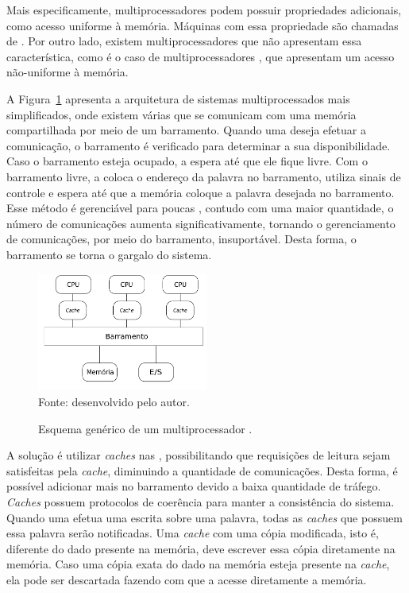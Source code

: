 Mais especificamente, multiprocessadores podem possuir propriedades adicionais,
como acesso uniforme à memória. Máquinas com essa propriedade são chamadas de
\uma. Por outro lado, existem multiprocessadores que não apresentam essa
característica, como é o caso de multiprocessadores \numa, que apresentam um acesso
não-uniforme à memória.


A Figura~\ref{fig:uma} apresenta a arquitetura de sistemas multiprocessados \uma
mais simplificados, onde existem várias \cpus que se
comunicam com uma memória compartilhada por meio de um barramento. Quando uma
\cpu deseja efetuar a comunicação, o barramento é verificado para
determinar a sua disponibilidade. Caso o barramento esteja ocupado, a
\cpu espera até que ele fique livre. Com o barramento livre, a \cpu
coloca o endereço da palavra no barramento, utiliza sinais de
controle e espera até que a memória coloque a palavra desejada no barramento. Esse
método é gerenciável para poucas \cpus, contudo com uma maior quantidade, o
número de comunicações aumenta significativamente, tornando
o gerenciamento de comunicações, por meio do barramento, insuportável. Desta
forma, o barramento se torna o gargalo do sistema.

\begin{figure}[t]
	\centering
    \caption{Esquema genérico de um multiprocessador \uma.}
    \includegraphics[width=0.5\textwidth]{figs/multiproc.pdf} \\
    Fonte: desenvolvido pelo autor.
    \label{fig:uma}
\end{figure}

A solução é utilizar \textit{caches} nas \cpus, possibilitando que requisições
de leitura sejam satisfeitas pela \textit{cache}, diminuindo a quantidade de
comunicações. Desta forma, é possível adicionar mais \cpus no barramento devido a baixa
quantidade de tráfego. \textit{Caches} possuem protocolos de coerência para
manter a consistência do sistema. Quando uma \cpu
efetua uma escrita sobre uma palavra, todas as \textit{caches} que possuem essa
palavra serão notificadas. Uma \textit{cache} com uma cópia modificada, isto é,
diferente do dado presente na memória, deve escrever essa cópia diretamente na
memória. Caso uma cópia exata do dado na memória esteja presente na
\textit{cache}, ela pode ser descartada fazendo com que a \cpu acesse
diretamente a memória.

